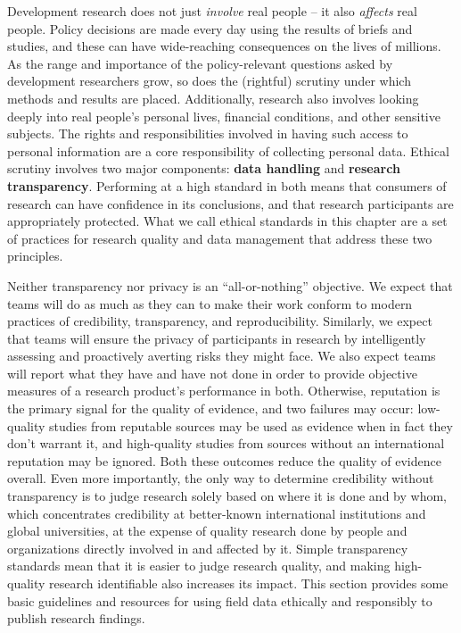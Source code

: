 
\begin{fullwidth}
	Development research does not just \textit{involve} real people -- it also \textit{affects} real people.
	Policy decisions are made every day using the results of briefs and studies,
	and these can have wide-reaching consequences on the lives of millions.
	As the range and importance of the policy-relevant questions
	asked by development researchers grow,
	so does the (rightful) scrutiny under which methods and results are placed.
	Additionally, research also involves looking deeply into real people's
	personal lives, financial conditions, and other sensitive subjects.
	The rights and responsibilities involved in having such access
	to personal information are a core responsibility of collecting personal data.
	Ethical scrutiny involves two major components: \textbf{data handling} and \textbf{research transparency}.
	Performing at a high standard in both means that
	consumers of research can have confidence in its conclusions,
	and that research participants are appropriately protected.
	What we call ethical standards in this chapter are a set of practices
	for research quality and data management that address these two principles.

	Neither transparency nor privacy is an ``all-or-nothing'' objective.
	We expect that teams will do as much as they can to make their work
	conform to modern practices of credibility, transparency, and reproducibility.
	Similarly, we expect that teams will ensure the privacy of participants in research
	by intelligently assessing and proactively averting risks they might face.
	We also expect teams will report what they have and have not done
	in order to provide objective measures of a research product's performance in both.
	Otherwise, reputation is the primary signal for the quality of evidence, and two failures may occur:
	low-quality studies from reputable sources may be used as evidence when in fact they don't warrant it,
	and high-quality studies from sources without an international reputation may be ignored.
	Both these outcomes reduce the quality of evidence overall.
	Even more importantly, the only way to determine credibility without transparency
  is to judge research solely based on where it is done and by whom,
  which concentrates credibility at better-known international institutions and global universities,
  at the expense of quality research done by people and organizations directly involved in and affected by it.
	Simple transparency standards mean that it is easier to judge research quality,
	and making high-quality research identifiable also increases its impact.
	This section provides some basic guidelines and resources
	for using field data ethically and responsibly to publish research findings.
\end{fullwidth}


